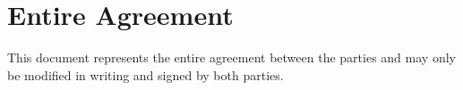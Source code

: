 
\section{Entire Agreement}
\label{sec:agreement}

This document represents the entire agreement between the parties and may only be modified in writing and signed by both parties.

